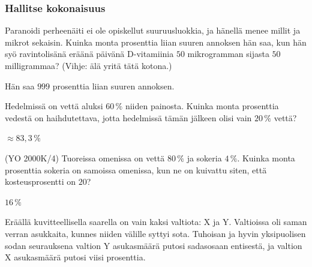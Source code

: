 \begin{tehtavasivu}
\subsubsection*{Hallitse kokonaisuus}

\begin{tehtava}
Paranoidi perheenäiti ei ole opiskellut suuruusluokkia, ja hänellä menee millit ja mikrot sekaisin. Kuinka monta prosenttia liian suuren annoksen hän saa, kun hän syö ravintolisänä eräänä päivänä D-vitamiinia $50$ mikrogramman sijasta $50$ milligrammaa? (Vihje: älä yritä tätä kotona.)
	\begin{vastaus}
 Hän saa $999$ prosenttia liian suuren annoksen.
	\end{vastaus}
\end{tehtava}


\begin{tehtava}
    Hedelmissä on vettä aluksi $60\,\%$ niiden painosta. Kuinka monta prosenttia vedestä on haihdutettava, jotta hedelmissä tämän jälkeen olisi vain $20\,\%$ vettä?
    \begin{vastaus}
        $\approx83,3\,\%$ %
    \end{vastaus}
\end{tehtava}


\begin{tehtava}
    (YO 2000K/4) Tuoreissa omenissa on vettä $80\,\%$ ja sokeria $4\,\%$. Kuinka monta prosenttia sokeria on samoissa omenissa, kun ne on kuivattu siten, että kosteusprosentti on $20$?
    \begin{vastaus}
        $16\,\%$
    \end{vastaus}
\end{tehtava}

\begin{tehtava}
Eräällä kuvitteellisella saarella on vain kaksi valtiota: X ja Y. Valtioissa oli saman verran asukkaita, kunnes niiden välille syttyi sota. Tuhoisan ja hyvin yksipuolisen sodan seurauksena valtion Y asukasmäärä putosi sadasosaan entisestä, ja valtion X asukasmäärä putosi viisi prosenttia.
	\begin{vastaus}
	\end{vastaus}
\end{tehtava}


\end{tehtavasivu}
